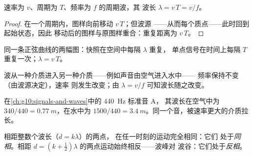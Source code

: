 \begin{theorem}[波的基本关系式]\label{thm:g12:mechanical-waves:relation}
速率为 $v$、周期为 $T$、频率为 $f$ 的周期波，其
波长 $\lambda = v\,T = v/f$。
\end{theorem}

\begin{proof}
在一个周期内，图样向前移动 $v\,T$；但波源
——从而每个质点——此时回到起始状态，因此
移动后的图样与原图样重合：重复距离为 $v\,T$。
\end{proof}

\begin{omfigure}

{\small 同一条正弦曲线的两幅图：快照在空间中每隔 $\lambda$ 重复，
单点信号在时间上每隔 $T$ 重复一次；$\lambda = v\,T$。}
\end{omfigure}

\begin{remark}[频率由波源决定]\label{rem:g12:mechanical-waves:source}
波从一种介质进入另一种介质——例如声音由空气进入水中——
频率保持不变（由波源决定），速率
则发生改变；由 $\lambda = v/f$ 可知波长随之改变。
\end{remark}

\begin{example}\label{ex:g12:mechanical-waves:concertA}
在\cref{ch:g10:signals-and-waves}中的 \qty{440}{Hz} 标准音 A，
其波长在空气中为 $340/440 = \qty{0.77}{m}$，在水中为 $1500/440 =
\qty{3.4}{m}$。同一个音，被速率更大的介质拉长。
\end{example}

\begin{definition}[同相与反相]\label{def:g12:mechanical-waves:phase}
相距整数个波长（$d = k\lambda$）的两点，
在任一时刻的运动完全相同：它们
处于\emph{同相}。相距
$d = (k + \tfrac12)\lambda$ 的两点运动始终相反——波峰对
波谷：它们处于\emph{反相}。
\end{definition}

